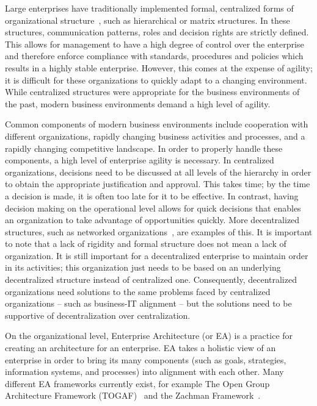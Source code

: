 Large enterprises have traditionally implemented formal, centralized forms of organizational structure~\cite{pearlson2009}, such as hierarchical or matrix structures. In these structures, communication patterns, roles and decision rights are strictly defined. This allows for management to have a high degree of control over the enterprise and therefore enforce compliance with standards, procedures and policies which results in a highly stable enterprise. However, this comes at the expense of agility; it is difficult for these organizations to quickly adapt to a changing environment. While centralized structures were appropriate for the business environments of the past, modern business environments demand a high level of agility.

Common components of modern business environments include cooperation with different organizations,  rapidly changing business activities and processes, and a rapidly changing competitive landscape. In order to properly handle these components, a high level of enterprise agility is necessary. In centralized organizations, decisions need to be discussed at all levels of the hierarchy in order to obtain the appropriate justification and approval. This takes time; by the time a decision is made, it is often too late for it to be effective. In contrast, having decision making on the operational level allows for quick decisions that enables an organization to take advantage of opportunities quickly. More decentralized structures, such as networked organizations~\cite{pearlson2009}, are examples of this. It is important to note that a lack of rigidity and formal structure does not mean a lack of organization. It is still important for a decentralized enterprise to maintain order in its activities; this organization just needs to be based on an underlying decentralized structure instead of centralized one. Consequently, decentralized organizations need solutions to the same problems faced by centralized organizations -- such as business-IT alignment -- but the solutions need to be supportive of decentralization over centralization. 

On the organizational level, Enterprise Architecture (or EA) is a practice for creating an architecture for an enterprise. EA takes a holistic view of an enterprise in order to bring its many components (such as goals, strategies, information systems, and processes) into alignment with each other. Many different EA frameworks currently exist, for example The Open Group Architecture Framework (TOGAF)~\cite{togaf9.1} and the Zachman Framework~\cite{zachman}. 

